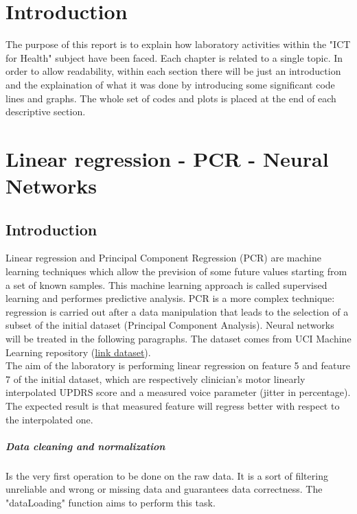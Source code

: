\documentclass{article}
\begin{document}
\newpage
\tableofcontents
{}
\newpage
{}

\section{Introduction}
The purpose of this report is to explain how laboratory activities within the "ICT for Health" subject have been faced. Each chapter is related to a single topic. In order to allow readability, within each section there will be just an introduction and the explaination of what it was done by introducing some significant code lines and graphs. The whole set of codes and plots is placed at the end of each descriptive section. 

\section{Linear regression - PCR - Neural Networks}
\subsection{Introduction}
Linear regression and Principal Component Regression (PCR) are machine learning techniques which allow the prevision of some future values starting from a set of known samples. This machine learning approach is called supervised learning and performes predictive analysis. PCR is a more complex technique: regression is carried out after a data manipulation that leads to the selection of a subset of the initial dataset (Principal Component Analysis). Neural networks will be treated in the following paragraphs.
The dataset comes from UCI Machine Learning repository (\href{https://archive.ics.uci.edu/ml/datasets/Parkinsons+Telemonitoring}{link dataset}).\\

The aim of the laboratory is performing linear regression on feature 5 and feature 7 of the initial dataset, which are respectively clinician's motor linearly interpolated UPDRS score and a measured voice parameter (jitter in percentage). The expected result is that measured feature will regress better with respect to the interpolated one.

\subparagraph{Data cleaning and normalization} 
Is the very first operation to be done on the raw data. It is a sort of filtering unreliable and wrong or missing data and guarantees data correctness. The "dataLoading" function aims to perform this task.\\
\end{document}

